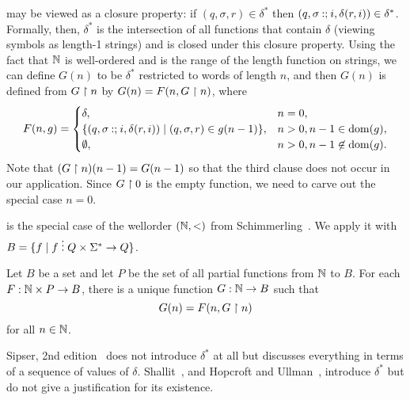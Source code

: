		 may be viewed as a closure property:
		if $(q,\sigma,r)\in\delta^*$ then $(q,\sigma\mathbin{{:}{;}} i,\delta(r,i))\in\delta^*$.
		Formally, then, $\delta^*$ is the intersection of all functions that contain $\delta$ (viewing symbols as length-1 strings) and is closed under this closure property.
		Using the fact that $\mathbb{N}$ is well-ordered and is the range of the length function on strings,
		we can define $G(n)$ to be $\delta^*$ restricted to words of length $n$, and then $G(n)$ is defined from $G\upharpoonright n$ by $G(n)=F(n,G\upharpoonright n)$, where
		\[
			F(n,g)=
			\begin{cases}
				\delta,														 & n=0,\\
				\{(q,\sigma\mathbin{{:}{;}} i,\delta(r,i)) \mid (q,\sigma,r)\in g(n-1)\},  & n>0, n-1\in\mathrm{dom}(g),\\
				\emptyset,													  & n>0, n-1\not\in\mathrm{dom}(g).
			\end{cases}
		\]
		Note that $(G\upharpoonright n)(n-1)=G(n-1)$ so that the third clause does not occur in our application.
		Since $G\upharpoonright 0$ is the empty function, we need to carve out the special case $n=0$.

		 is the special case of the wellorder $(\mathbb{N},<)$ from Schimmerling~\cite[Theorem 3.8]{MR2839729}.
		We apply it with $B=\{f\mid f\mathrel{\vdots} Q\times\Sigma^*\to Q\}$.
		\begin{theorem}\label{may3-2022}
			Let $B$ be a set and let $P$ be the set of all partial functions from $\mathbb{N}$ to $B$.
			For each $F: \mathbb{N}\times P\to B$, there is a unique function $G: \mathbb{N}\to B$ such that
			\[
				G(n)=F(n,G\upharpoonright n)
			\]
			for all $n\in\mathbb{N}$.
		\end{theorem}

		\begin{remark}
			Sipser, 2nd edition~\cite{sipser2012introduction} does not introduce $\delta^*$ at all but discusses everything in terms of a sequence of values of $\delta$.
			Shallit~\cite{Shallit:2008:SCF:1434864}, and Hopcroft and Ullman~\cite{MR645539}, introduce $\delta^*$ but do not give a justification for its existence.
		\end{remark}



